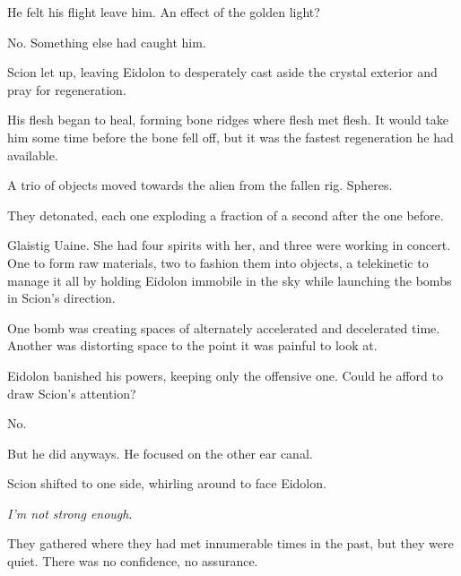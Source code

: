 He felt his flight leave him.  An effect of the golden light?



No.  Something else had caught him.



Scion let up, leaving Eidolon to desperately cast aside the crystal exterior and pray for regeneration.



His flesh began to heal, forming bone ridges where flesh met flesh.  It would take him some time before the bone fell off, but it was the fastest regeneration he had available.



A trio of objects moved towards the alien from the fallen rig.  Spheres.



They detonated, each one exploding a fraction of a second after the one before.



Glaistig Uaine.  She had four spirits with her, and three were working in concert. One to form raw materials, two to fashion them into objects, a telekinetic to manage it all by holding Eidolon immobile in the sky while launching the bombs in Scion's direction.



One bomb was creating spaces of alternately accelerated and decelerated time.  Another was distorting space to the point it was painful to look at.



Eidolon banished his powers, keeping only the offensive one.  Could he afford to draw Scion's attention?



No.



But he did anyways.  He focused on the other ear canal.



Scion shifted to one side, whirling around to face Eidolon.



\emph{I'm not strong enough}.



\sectionbreak






They gathered where they had met innumerable times in the past, but they were quiet.  There was no confidence, no assurance.



